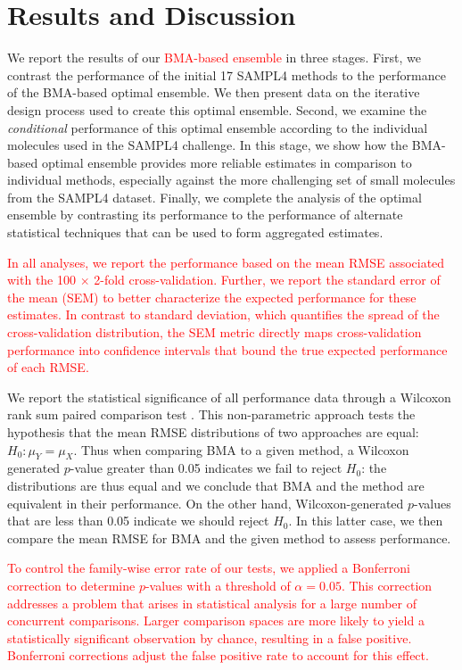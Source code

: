 \documentclass[journal=jpcbfk, manuscript=article]{achemso}
\newcommand{\+}[1]{\ensuremath{\mathbf{#1}}}
\newcommand{\rev}[1]{\textsf{\textcolor{red}{#1}}}
\begin{document}
\section{Results and Discussion} \label{Results}
We report the results of our \rev{BMA-based ensemble} in three stages.
First, we contrast the performance of the initial 17 SAMPL4 methods to the performance of the BMA-based optimal ensemble.
We then present data on the iterative design process used to create this optimal ensemble.
Second, we examine the \emph{conditional} performance of this optimal ensemble according to the individual molecules used in the SAMPL4 challenge.
In this stage, we show how the BMA-based optimal ensemble provides more reliable estimates in comparison to individual methods, especially against the more challenging set of small molecules from the SAMPL4 dataset.
Finally, we complete the analysis of the optimal ensemble by contrasting its performance to the performance of alternate statistical techniques that can be used to form aggregated estimates. 

\rev{In all analyses, we report the performance based on the mean RMSE associated with the 100 $\times$ 2-fold cross-validation. 
Further, we report the standard error of the mean (SEM) to better characterize the expected performance for these estimates. 
In contrast to standard deviation, which quantifies the spread of the cross-validation distribution, the SEM metric directly maps cross-validation performance into confidence intervals that bound the true expected performance of each RMSE.}
 
We report the statistical significance of all performance data through a Wilcoxon rank sum paired comparison test \cite{Wilcoxon:45}.
This non-parametric approach tests the hypothesis that the mean RMSE distributions of two approaches are equal: $H_0 : \mu_Y = \mu_X$.
Thus when comparing BMA to a given method, a Wilcoxon generated $p$-value greater than 0.05 indicates we fail to reject $H_0$: the distributions are thus equal and we conclude that BMA and the method are equivalent in their performance.
On the other hand, Wilcoxon-generated $p$-values that are less than 0.05 indicate we should reject $H_0$.
In this latter case, we then compare the mean RMSE for BMA and the given method to assess performance.

\rev{To control the family-wise error rate of our tests, we applied a Bonferroni correction to determine $p$-values with a threshold of $\alpha = 0.05$.
This correction addresses a problem that arises in statistical analysis for a large number of concurrent comparisons.
Larger comparison spaces are more likely to yield a statistically significant observation by chance, resulting in a false positive.
Bonferroni corrections adjust the false positive rate to account for this effect.}
\end{document}
